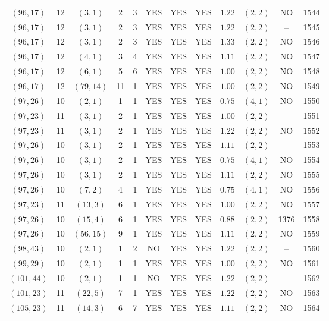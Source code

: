 \begin{longtable}{|c|c|c|c|c|c|c|c|c|c|c|c|}
$(96,17)$ & 12 & $(3,1)$ & 2 & 3 & YES & YES & YES & $1.22$ & $(2,2)$ & NO & 1544\\
$(96,17)$ & 12 & $(3,1)$ & 2 & 3 & YES & YES & YES & $1.22$ & $(2,2)$ & -- & 1545\\
$(96,17)$ & 12 & $(3,1)$ & 2 & 3 & YES & YES & YES & $1.33$ & $(2,2)$ & NO & 1546\\
$(96,17)$ & 12 & $(4,1)$ & 3 & 4 & YES & YES & YES & $1.11$ & $(2,2)$ & NO & 1547\\
$(96,17)$ & 12 & $(6,1)$ & 5 & 6 & YES & YES & YES & $1.00$ & $(2,2)$ & NO & 1548\\
$(96,17)$ & 12 & $(79,14)$ & 11 & 1 & YES & YES & YES & $1.00$ & $(2,2)$ & NO & 1549\\
$(97,26)$ & 10 & $(2,1)$ & 1 & 1 & YES & YES & YES & $0.75$ & $(4,1)$ & NO & 1550\\
$(97,23)$ & 11 & $(3,1)$ & 2 & 1 & YES & YES & YES & $1.00$ & $(2,2)$ & -- & 1551\\
$(97,23)$ & 11 & $(3,1)$ & 2 & 1 & YES & YES & YES & $1.22$ & $(2,2)$ & NO & 1552\\
$(97,26)$ & 10 & $(3,1)$ & 2 & 1 & YES & YES & YES & $1.11$ & $(2,2)$ & -- & 1553\\
$(97,26)$ & 10 & $(3,1)$ & 2 & 1 & YES & YES & YES & $0.75$ & $(4,1)$ & NO & 1554\\
$(97,26)$ & 10 & $(3,1)$ & 2 & 1 & YES & YES & YES & $1.11$ & $(2,2)$ & NO & 1555\\
$(97,26)$ & 10 & $(7,2)$ & 4 & 1 & YES & YES & YES & $0.75$ & $(4,1)$ & NO & 1556\\
$(97,23)$ & 11 & $(13,3)$ & 6 & 1 & YES & YES & YES & $1.00$ & $(2,2)$ & NO & 1557\\
$(97,26)$ & 10 & $(15,4)$ & 6 & 1 & YES & YES & YES & $0.88$ & $(2,2)$ & 1376 & 1558\\
$(97,26)$ & 10 & $(56,15)$ & 9 & 1 & YES & YES & YES & $1.11$ & $(2,2)$ & NO & 1559\\
$(98,43)$ & 10 & $(2,1)$ & 1 & 2 & NO & YES & YES & $1.22$ & $(2,2)$ & -- & 1560\\
$(99,29)$ & 10 & $(2,1)$ & 1 & 1 & YES & YES & YES & $1.00$ & $(2,2)$ & NO & 1561\\
$(101,44)$ & 10 & $(2,1)$ & 1 & 1 & NO & YES & YES & $1.22$ & $(2,2)$ & -- & 1562\\
$(101,23)$ & 11 & $(22,5)$ & 7 & 1 & YES & YES & YES & $1.22$ & $(2,2)$ & NO & 1563\\
$(105,23)$ & 11 & $(14,3)$ & 6 & 7 & YES & YES & YES & $1.11$ & $(2,2)$ & NO & 1564\\

\end{longtable}
